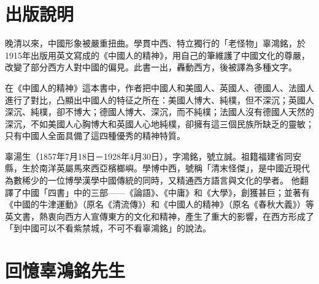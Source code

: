 
\section[出版說明]{出版說明}

晚清以來，中國形象被嚴重扭曲。學貫中西、特立獨行的「老怪物」辜鴻銘，於1915年出版用英文寫成的《中國人的精神》，用自己的筆維護了中國文化的尊嚴，改變了部分西方人對中國的偏見。此書一出，轟動西方，後被譯為多種文字。　　

在《中國人的精神》這本書中，作者把中國人和美國人、英國人、德國人、法國人進行了對比，凸顯出中國人的特征之所在：美國人博大、純樸，但不深沉；英國人深沉、純樸，卻不博大；德國人博大、深沉，而不純樸；法國人沒有德國人天然的深沉，不如美國人心胸博大和英國人心地純樸，卻擁有這三個民族所缺乏的靈敏；只有中國人全面具備了這四種優秀的精神特質。

辜湯生（1857年7月18日－1928年4月30日），字鴻銘，號立誠。祖籍福建省同安縣，生於南洋英屬馬來西亞檳榔嶼。學博中西，號稱「清末怪傑」，是中國近現代為數稀少的一位博學漢學中國傳統的同時，又精通西方語言與文化的學者。
他翻譯了中國「四書」中的三部——《論語》、《中庸》和《大學》，創獲甚巨；並著有《中國的牛津運動》（原名《清流傳》）和《中國人的精神》（原名《春秋大義》）等英文書，熱衷向西方人宣傳東方的文化和精神，產生了重大的影響，在西方形成了「到中國可以不看紫禁城，不可不看辜鴻銘」的說法。





\section[回憶辜鴻銘先生]{回憶辜鴻銘先生}

